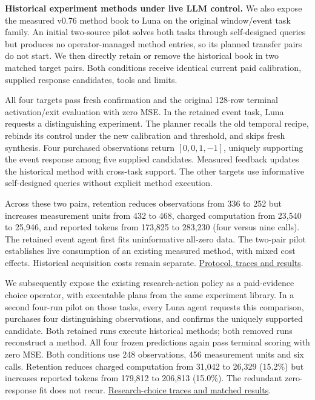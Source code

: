 \documentclass[11pt,a4paper]{article}
\begin{document}
\textbf{Historical experiment methods under live LLM control.} We also expose the
measured v0.76 method book to Luna on the original window/event task family.
An initial two-source pilot solves both tasks through self-designed queries but
produces no operator-managed method entries, so its planned transfer pairs do
not start. We then directly retain or remove the historical book in two matched
target pairs. Both conditions receive identical current paid calibration,
supplied response candidates, tools and limits.


All four targets pass fresh confirmation and the original 128-row terminal
activation/exit evaluation with zero MSE. In the retained event task, Luna
requests a distinguishing experiment. The planner recalls the old temporal
recipe, rebinds its control under the new calibration and threshold, and skips
fresh synthesis. Four purchased observations return \([0,0,1,-1]\), uniquely
supporting the event response among five supplied candidates. Measured feedback
updates the historical method with cross-task support. The other targets use
informative self-designed queries without explicit method execution.


Across these two pairs, retention reduces observations from 336 to 252 but
increases measurement units from 432 to 468, charged computation from 23,540 to
25,946, and reported tokens from 173,825 to 283,230 (four versus nine calls).
The retained event agent first fits uninformative all-zero data. The two-pair
pilot establishes live consumption of an existing measured method, with mixed
cost effects. Historical acquisition costs remain separate.
\hyperlink{artifact-75}{Protocol, traces and results}.


We subsequently expose the existing research-action policy as a paid-evidence
choice operator, with executable plans from the same experiment library. In a
second four-run pilot on those tasks, every Luna agent requests this comparison,
purchases four distinguishing observations, and confirms the uniquely supported
candidate. Both retained runs execute historical methods; both removed runs
reconstruct a method. All four frozen predictions again pass terminal scoring
with zero MSE. Both conditions use 248 observations, 456 measurement units and
six calls. Retention reduces charged computation from 31,042 to 26,329 (15.2\%)
but increases reported tokens from 179,812 to 206,813 (15.0\%). The redundant
zero-response fit does not recur.
\hyperlink{artifact-76}{Research-choice traces and matched results}.
\end{document}
